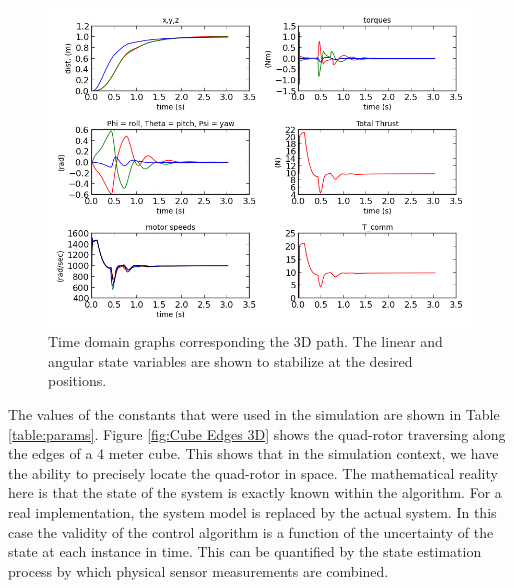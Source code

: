 \begin{figure}[htbp]
	\centering
		\includegraphics[scale = 0.5]{Figures/typical_run_time_domain.png}
	\caption[Time domain graphs corresponding the 3D path. The linear and angular state variables are shown to stabilize at the desired positions. ]{Time domain graphs corresponding the 3D path. The linear and angular state variables are shown to stabilize at the desired positions. }
	\label{fig:Typical Run Time Domain}
\end{figure}
The values of the constants that were used in the simulation are shown in Table \ref{table:params}. Figure \ref{fig:Cube Edges 3D} shows the quad-rotor traversing along the edges of a 4 meter cube. This shows that in the simulation context, we have the ability to precisely locate the quad-rotor in space. The mathematical reality here is that the state of the system is exactly known within the algorithm. For a real implementation, the system model is replaced by the actual system. In this case the validity of the control algorithm is a function of the uncertainty of the state at each instance in time. This can be quantified by the state estimation process by which physical sensor measurements are combined.
